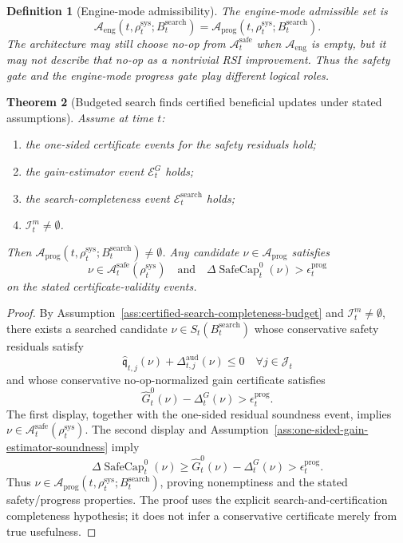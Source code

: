 \documentclass[11pt,a4paper]{article}
\newtheorem{theorem}{Theorem}[section]
\newtheorem{definition}[theorem]{Definition}
\newcommand{\Acal}{\mathcal A}
\newcommand{\Ecal}{\mathcal E}
\newcommand{\sys}{\mathrm{sys}}
\newcommand{\safe}{\mathrm{safe}}
\newcommand{\aud}{\mathrm{aud}}
\newcommand{\SafeCap}{\operatorname{SafeCap}}
\newcommand{\search}{\mathrm{search}}
\begin{document}
\begin{definition}[Engine-mode admissibility]
\label{def:engine-mode-admissibility}
The engine-mode admissible set is
\[
\Acal_{\mathrm{eng}}(t,\rho_t^{\sys};B_t^{\search})
=
\Acal_{\mathrm{prog}}(t,\rho_t^{\sys};B_t^{\search}).
\]
The architecture may still choose no-op from \(\Acal_t^{\safe}\) when \(\Acal_{\mathrm{eng}}\) is empty, but it may not describe that no-op as a nontrivial RSI improvement.  Thus the safety gate and the engine-mode progress gate play different logical roles.
\end{definition}

\begin{theorem}[Budgeted search finds certified beneficial updates under stated assumptions]
\label{thm:budgeted-search-finds-beneficial-updates}
Assume at time \(t\):
\begin{enumerate}[label=(\alph*),leftmargin=1.5em]
    \item the one-sided certificate events for the safety residuals hold;
    \item the gain-estimator event \(\Ecal_t^G\) holds;
    \item the search-completeness event \(\Ecal_t^{\search}\) holds;
    \item \(\mathcal I_t^{m}\neq\emptyset\).
\end{enumerate}
Then \(\Acal_{\mathrm{prog}}(t,\rho_t^{\sys};B_t^{\search})\neq\emptyset\).  Any candidate \(\nu\in\Acal_{\mathrm{prog}}\) satisfies
\[
\nu\in\Acal_t^{\safe}(\rho_t^{\sys})
\quad\text{and}\quad
\Delta\SafeCap_t^{0}(\nu)>\epsilon_t^{\mathrm{prog}}
\]
on the stated certificate-validity events.
\end{theorem}

\begin{proof}
By Assumption~\ref{ass:certified-search-completeness-budget} and \(\mathcal I_t^m\neq\emptyset\), there exists a searched candidate \(\nu\in S_t(B_t^{\search})\) whose conservative safety residuals satisfy
\[
\widehat{\mathfrak q}_{t,j}(\nu)+\Delta_{t,j}^{\aud}(\nu)\le0
\quad\forall j\in\mathcal J_t
\]
and whose conservative no-op-normalized gain certificate satisfies
\[
\widehat G_t^{0}(\nu)-\Delta_t^G(\nu)>
\epsilon_t^{\mathrm{prog}}.
\]
The first display, together with the one-sided residual soundness event, implies \(\nu\in\Acal_t^{\safe}(\rho_t^{\sys})\).  The second display and Assumption~\ref{ass:one-sided-gain-estimator-soundness} imply
\[
\Delta\SafeCap_t^{0}(\nu)
\ge
\widehat G_t^{0}(\nu)-\Delta_t^{G}(\nu)
>
\epsilon_t^{\mathrm{prog}}.
\]
Thus \(\nu\in\Acal_{\mathrm{prog}}(t,\rho_t^{\sys};B_t^{\search})\), proving nonemptiness and the stated safety/progress properties.  The proof uses the explicit search-and-certification completeness hypothesis; it does not infer a conservative certificate merely from true usefulness.
\end{proof}
\end{document}

